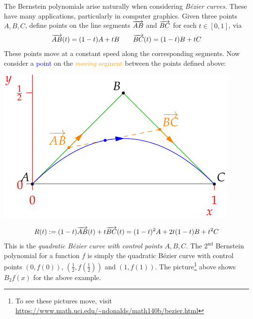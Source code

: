 \begin{minipage}[t]{0.53\linewidth}\vspace{0pt}
The Bernstein polynomials arise naturally when considering \emph{Bézier curves.} These have many applications, particularly in computer graphics. Given three points $A,B,C$, define points on the line segments $\overrightarrow{AB}$ and $\overrightarrow{BC}$ for each $t\in[0,1]$, via
\[\overrightarrow{AB}(t)=(1-t)A+tB\qquad \overrightarrow{BC}(t)=(1-t)B+tC\]
These points move at a constant speed along the corresponding segments. Now consider a \textcolor{blue}{point} on the \textcolor{orange}{\emph{moving} segment} between the points defined above:
\end{minipage}\begin{minipage}[t]{0.47\linewidth}\vspace{0pt}
\flushright\includegraphics{bezier2}
\end{minipage}\smallbreak

\[R(t):=(1-t)\overrightarrow{AB}(t)+t\overrightarrow{BC}(t) =(1-t)^2A+2t(1-t)B+t^2C\]
This is the \emph{quadratic Bézier curve with control points $A,B,C$.} The $2^\text{nd}$ Bernstein polynomial for a function $f$ is simply the quadratic Bézier curve with control points $\left(0,f(0)\right)$, $\left(\frac 12,f(\frac 12)\right)$ and $\left(1,f(1)\right)$. The picture\footnote{To see these pictures move, visit \url{https://www.math.uci.edu/~ndonalds/math140b/bezier.html}} above shows $B_2f(x)$ for the above example.\medbreak

